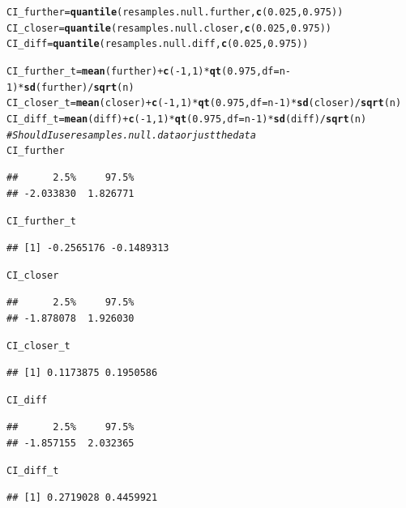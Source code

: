 \documentclass{article}\usepackage[]{graphicx}\usepackage[]{xcolor}
\makeatletter
\newcommand{\hlnum}[1]{\textcolor[rgb]{0.686,0.059,0.569}{#1}}%
\newcommand{\hlcom}[1]{\textcolor[rgb]{0.678,0.584,0.686}{\textit{#1}}}%
\newcommand{\hlopt}[1]{\textcolor[rgb]{0,0,0}{#1}}%
\newcommand{\hldef}[1]{\textcolor[rgb]{0.345,0.345,0.345}{#1}}%
\newcommand{\hlkwb}[1]{\textcolor[rgb]{0.69,0.353,0.396}{#1}}%
\newcommand{\hlkwc}[1]{\textcolor[rgb]{0.333,0.667,0.333}{#1}}%
\newcommand{\hlkwd}[1]{\textcolor[rgb]{0.737,0.353,0.396}{\textbf{#1}}}%
\newenvironment{kframe}{%
 \def\at@end@of@kframe{}%
 \ifinner\ifhmode%
  \def\at@end@of@kframe{\end{minipage}}%
  \begin{minipage}{\columnwidth}%
 \fi\fi%
 \def\FrameCommand##1{\hskip\@totalleftmargin \hskip-\fboxsep
 \colorbox{shadecolor}{##1}\hskip-\fboxsep
     \hskip-\linewidth \hskip-\@totalleftmargin \hskip\columnwidth}%
 \MakeFramed {\advance\hsize-\width
   \@totalleftmargin\z@ \linewidth\hsize
   \@setminipage}}%
 {\par\unskip\endMakeFramed%
 \at@end@of@kframe}
\newenvironment{knitrout}{}{} %
\makeatother
\begin{document}
\begin{enumerate}
\begin{enumerate}
\begin{knitrout}
\begin{kframe}
\begin{alltt}
\hldef{CI_further} \hlkwb{=} \hlkwd{quantile}\hldef{(resamples.null.further,} \hlkwd{c}\hldef{(}\hlnum{0.025}\hldef{,} \hlnum{0.975}\hldef{))}
\hldef{CI_closer} \hlkwb{=} \hlkwd{quantile}\hldef{(resamples.null.closer,} \hlkwd{c}\hldef{(}\hlnum{0.025}\hldef{,} \hlnum{0.975}\hldef{))}
\hldef{CI_diff} \hlkwb{=} \hlkwd{quantile}\hldef{(resamples.null.diff,} \hlkwd{c}\hldef{(}\hlnum{0.025}\hldef{,} \hlnum{0.975}\hldef{))}

\hldef{CI_further_t} \hlkwb{=} \hlkwd{mean}\hldef{(further)} \hlopt{+} \hlkwd{c}\hldef{(}\hlopt{-}\hlnum{1}\hldef{,} \hlnum{1}\hldef{)} \hlopt{*} \hlkwd{qt}\hldef{(}\hlnum{0.975}\hldef{,} \hlkwc{df} \hldef{= n}\hlopt{-}\hlnum{1}\hldef{)} \hlopt{*} \hlkwd{sd}\hldef{(further)}\hlopt{/}\hlkwd{sqrt}\hldef{(n)}
\hldef{CI_closer_t} \hlkwb{=} \hlkwd{mean}\hldef{(closer)} \hlopt{+} \hlkwd{c}\hldef{(}\hlopt{-}\hlnum{1}\hldef{,} \hlnum{1}\hldef{)} \hlopt{*} \hlkwd{qt}\hldef{(}\hlnum{0.975}\hldef{,} \hlkwc{df} \hldef{= n}\hlopt{-}\hlnum{1}\hldef{)} \hlopt{*} \hlkwd{sd}\hldef{(closer)}\hlopt{/}\hlkwd{sqrt}\hldef{(n)}
\hldef{CI_diff_t} \hlkwb{=} \hlkwd{mean}\hldef{(diff)} \hlopt{+} \hlkwd{c}\hldef{(}\hlopt{-}\hlnum{1}\hldef{,} \hlnum{1}\hldef{)} \hlopt{*} \hlkwd{qt}\hldef{(}\hlnum{0.975}\hldef{,} \hlkwc{df} \hldef{= n}\hlopt{-}\hlnum{1}\hldef{)} \hlopt{*} \hlkwd{sd}\hldef{(diff)}\hlopt{/}\hlkwd{sqrt}\hldef{(n)}
\hlcom{#Should I use resamples.null.data or just the data}
\hldef{CI_further}
\end{alltt}
\begin{verbatim}
##      2.5%     97.5% 
## -2.033830  1.826771
\end{verbatim}
\begin{alltt}
\hldef{CI_further_t}
\end{alltt}
\begin{verbatim}
## [1] -0.2565176 -0.1489313
\end{verbatim}
\begin{alltt}
\hldef{CI_closer}
\end{alltt}
\begin{verbatim}
##      2.5%     97.5% 
## -1.878078  1.926030
\end{verbatim}
\begin{alltt}
\hldef{CI_closer_t}
\end{alltt}
\begin{verbatim}
## [1] 0.1173875 0.1950586
\end{verbatim}
\begin{alltt}
\hldef{CI_diff}
\end{alltt}
\begin{verbatim}
##      2.5%     97.5% 
## -1.857155  2.032365
\end{verbatim}
\begin{alltt}
\hldef{CI_diff_t}
\end{alltt}
\begin{verbatim}
## [1] 0.2719028 0.4459921
\end{verbatim}
\end{kframe}
\end{knitrout}
  

\end{enumerate}
\end{enumerate}
\end{document}
